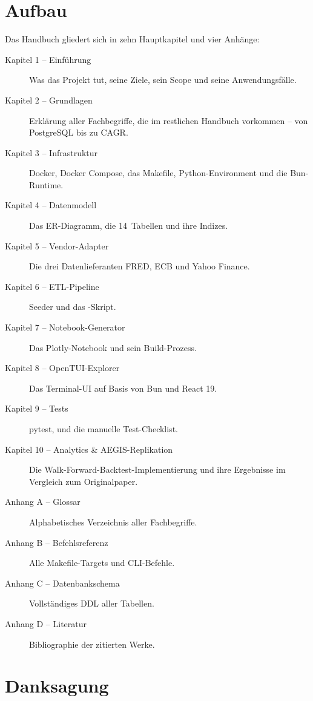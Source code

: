 \section{Aufbau}

Das Handbuch gliedert sich in zehn Hauptkapitel und vier Anhänge:

\begin{description}
  \item[Kapitel 1 -- Einführung] Was das Projekt tut, seine Ziele, sein
        Scope und seine Anwendungsfälle.
  \item[Kapitel 2 -- Grundlagen] Erklärung aller Fachbegriffe, die im
        restlichen Handbuch vorkommen -- von PostgreSQL bis zu
        CAGR.
  \item[Kapitel 3 -- Infrastruktur] Docker, Docker Compose, das Makefile,
        Python-Environment und die Bun-Runtime.
  \item[Kapitel 4 -- Datenmodell] Das ER-Diagramm, die 14~Tabellen und
        ihre Indizes.
  \item[Kapitel 5 -- Vendor-Adapter] Die drei Datenlieferanten FRED, ECB
        und Yahoo Finance.
  \item[Kapitel 6 -- ETL-Pipeline] Seeder und das -Skript.
  \item[Kapitel 7 -- Notebook-Generator] Das Plotly-Notebook und sein
        Build-Prozess.
  \item[Kapitel 8 -- OpenTUI-Explorer] Das Terminal-UI auf Basis von Bun
        und React 19.
  \item[Kapitel 9 -- Tests] pytest,  und die manuelle
        Test-Checklist.
  \item[Kapitel 10 -- Analytics \& AEGIS-Replikation] Die
        Walk-Forward-Backtest-Implementierung und ihre Ergebnisse
        im Vergleich zum Originalpaper.
  \item[Anhang A -- Glossar] Alphabetisches Verzeichnis aller
        Fachbegriffe.
  \item[Anhang B -- Befehlsreferenz] Alle Makefile-Targets und
        CLI-Befehle.
  \item[Anhang C -- Datenbankschema] Vollständiges DDL aller Tabellen.
  \item[Anhang D -- Literatur] Bibliographie der zitierten Werke.
\end{description}

\section{Danksagung}

